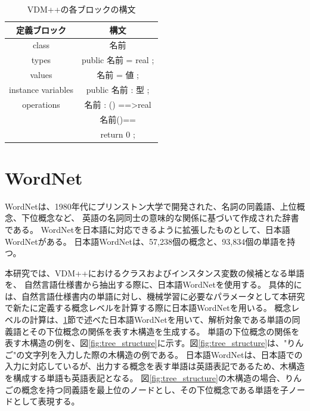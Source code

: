 \begin{table}[t]
    \begin{center}      
        \caption{VDM++の各ブロックの構文}\label{table:vdm_syntax}
        \begin{tabular}{c|c}
        定義ブロック  & 構文　\\ \hline \hline
        class & 名前 \\ \hline
        types	 & public 名前 = real ;\\ \hline
        values  & 名前 = 値 ;\\ \hline
        instance variables & public 名前 : 型 ;\\ \hline
        operations & 名前 : () ==\textgreater real\\
                   & 名前()==\\
                   & return 0 ;\\ \hline 
        \end{tabular}
    \end{center}
\end{table}

\section{WordNet}
\label{sec:wordNet}
WordNetは、1980年代にプリンストン大学で開発された、名詞の同義語、上位概念、下位概念など、
英語の名詞同士の意味的な関係に基づいて作成された辞書である\cite{wordNet}。
WordNetを日本語に対応できるように拡張したものとして、日本語WordNetがある\cite{jaWordNet}。
日本語WordNetは、57,238個の概念と、93,834個の単語を持つ。

本研究では、VDM++におけるクラスおよびインスタンス変数の候補となる単語を、
自然言語仕様書から抽出する際に、日本語WordNetを使用する。
具体的には、自然言語仕様書内の単語に対し、機械学習に必要なパラメータとして本研究で新たに定義する概念レベルを計算する際に日本語WordNetを用いる。
概念レベルの計算は、\ref{sec:wordNet}節で述べた日本語WordNetを用いて、解析対象である単語の同義語とその下位概念の関係を表す木構造を生成する。
単語の下位概念の関係を表す木構造の例を、図\ref{fig:tree_structure}に示す。図\ref{fig:tree_structure}は、"りんご"の文字列を入力した際の木構造の例である。
日本語WordNetは、日本語での入力に対応しているが、出力する概念を表す単語は英語表記であるため、木構造を構成する単語も英語表記となる。
図\ref{fig:tree_structure}の木構造の場合、りんごの概念を持つ同義語を最上位のノードとし、その下位概念である単語を子ノードとして表現する。

